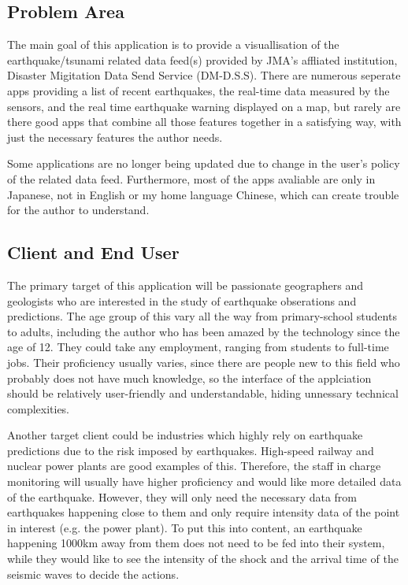 \documentclass{article}
\begin{document}
\subsection{Problem Area}
The main goal of this application is to provide a visuallisation of the earthquake/tsunami related data feed(s) provided by JMA's affliated institution, Disaster Migitation Data Send Service (DM-D.S.S). There are numerous seperate apps providing a list of recent earthquakes, the real-time data measured by the sensors, and the real time earthquake warning displayed on a map, but rarely are there good apps that combine all those features together in a satisfying way, with just the necessary features the author needs.

Some applications are no longer being updated due to change in the user's policy of the related data feed. Furthermore, most of the apps avaliable are only in Japanese, not in English or my home language Chinese, which can create trouble for the author to understand.

\subsection{Client and End User}
The primary target of this application will be passionate geographers and geologists who are interested in the study of earthquake obserations and predictions. The age group of this vary all the way from primary-school students to adults, including the author who has been amazed by the technology since the age of 12. They could take any employment, ranging from students to full-time jobs. Their proficiency usually varies, since there are people new to this field who probably does not have much knowledge, so the interface of the applciation should be relatively user-friendly and understandable, hiding unnessary technical complexities.

Another target client could be industries which highly rely on earthquake predictions due to the risk imposed by earthquakes. High-speed railway and nuclear power plants are good examples of this. Therefore, the staff in charge monitoring will usually have higher proficiency and would like more detailed data of the earthquake. However, they will only need the necessary data from earthquakes happening close to them and only require intensity data of the point in interest (e.g. the power plant). To put this into content, an earthquake happening 1000km away from them does not need to be fed into their system, while they would like to see the intensity of the shock and the arrival time of the seismic waves to decide the actions.
\end{document}
